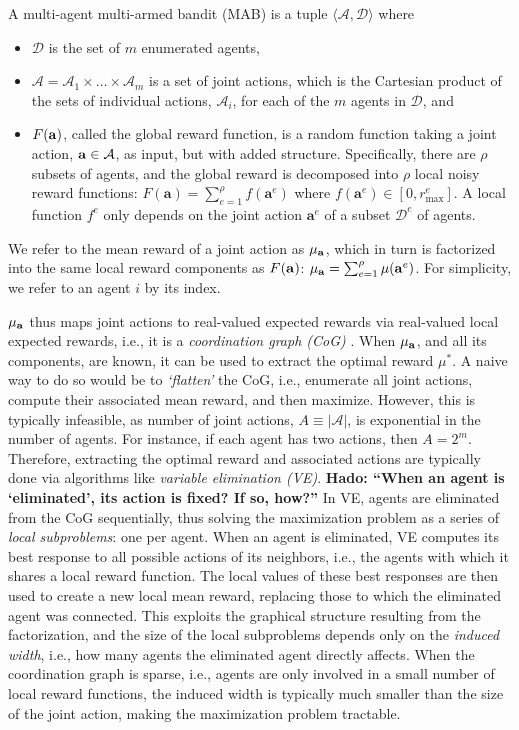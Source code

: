 \documentclass{article}
\def\hado#1{\textcolor{RubineRed}{\textbf{Hado: ``#1''}}}
\begin{document}
\begin{definition}
A multi-agent multi-armed bandit (MAB) is a tuple $\langle \mathcal{A},\mathcal{D}\rangle$ where
\begin{itemize}
\item $\mathcal{D}$ is the set of $m$ enumerated agents,
\item $\mathcal{A} = \mathcal{A}_1 \times \dots \times \mathcal{A} _{m}$ is a set of joint actions, which is the Cartesian product of the sets of individual actions, $\mathcal{A}_i$, for each of the $m$ agents in $\mathcal{D}$, and 
\item $F({\bf a})$, called the global reward function, is a random function taking a joint action,  ${\bf a} \in \mathcal{A}$, as input, but with added structure.  Specifically, there are $\rho$ subsets of agents, and the global reward is decomposed into $\rho$ local noisy reward functions: $F(\mathbf{a}) = \sum^\rho_{e=1} f(\mathbf{a}^e)$ where $f(\mathbf{a}^e) \in \left[0, r_{\max}^e\right]$. A local function $f^e$ only depends on the joint action $\mathbf{a}^e$ of a subset $\mathcal{D}^e$ of agents. 
\end{itemize}
We refer to the mean reward of a joint action as $\mu_{\bf a}$, which in turn is factorized into the same local reward components as $F({\bf a})$: $\mu_{\bf a} = \sum^\rho_{e=1} \mu(\mathbf{a}^e)$. For simplicity, we refer to an agent $i$ by its index.
\end{definition}
$\mu_{\bf a}$ thus maps joint actions to real-valued expected rewards via real-valued local expected rewards, i.e., it is a \emph{coordination graph (CoG)} \cite{Guestrin02,KokVlassis06}. When $\mu_{\bf a}$, and all its components, are known, it can be used to extract the optimal reward $\mu^*$. A naive way to do so would be to \emph{`flatten'} the CoG, i.e., enumerate all joint actions, compute their associated mean reward, and then maximize. However, this is typically infeasible, as number of joint actions, $A \equiv |\mathcal{A}|$, is exponential in the number of agents. For instance, if each agent has two actions, then $A = 2^m$. Therefore, extracting the optimal reward and associated actions are typically done via algorithms like \emph{variable elimination (VE)}. \hado{When an agent is `eliminated', its action is fixed?  If so, how?} In VE, agents are eliminated from the CoG sequentially, thus solving the maximization problem as a series of \emph{local subproblems}: one per agent. When an agent is eliminated, VE computes its best response to all possible actions of its neighbors, i.e., the agents with which it shares a local reward function. The local values of these best responses are then used to create a new local mean reward, replacing those to which the eliminated agent was connected. This exploits the graphical structure resulting from the factorization, and the size of the local subproblems depends only on the \emph{induced width}, i.e., how many agents the eliminated agent directly affects. When the coordination graph is sparse, i.e., agents are only involved in a small number of local reward functions, the induced width is typically much smaller than the size of the joint action, making the maximization problem tractable. 
\end{document}
